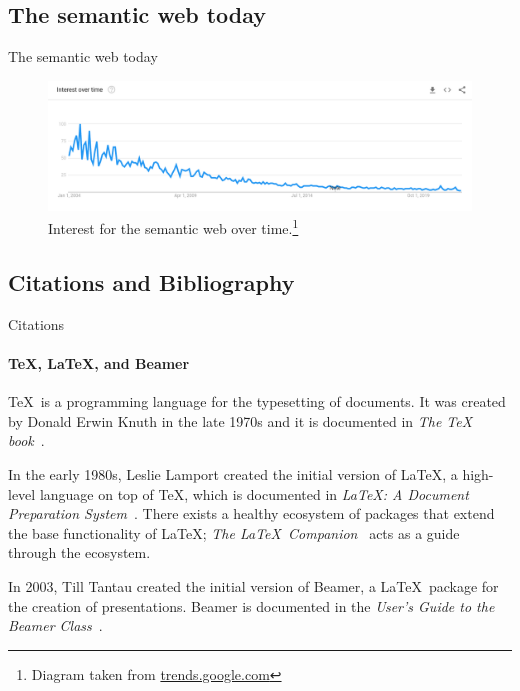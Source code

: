 \documentclass{beamer}
\begin{document}
	\subsection{The semantic web today}
	\begin{frame}{The semantic web today}
		\begin{figure}
			\includegraphics[scale=0.25]{resources/semantic-web-is-dead.png}
			\caption{Interest for the semantic web over time.\footnote[frame]{%
				Diagram taken from \url{trends.google.com} }}
		\end{figure}
	\end{frame}

	\subsection{Citations and Bibliography}
	\begin{frame}[label=citations]{Citations}
		\framesubtitle{\TeX, \LaTeX, and Beamer}

		\justifying\TeX\ is a programming language for the typesetting
		of documents. It was created by Donald Erwin Knuth in the late
		1970s and it is documented in \emph{The \TeX
		book}~\cite{knuth84}.

		In the early 1980s, Leslie Lamport created the initial version
		of \LaTeX, a high-level language on top of \TeX, which is
		documented in \emph{\LaTeX : A Document Preparation
		System}~\cite{lamport94}. There exists a healthy ecosystem of
		packages that extend the base functionality of \LaTeX;
		\emph{The \LaTeX\ Companion}~\cite{MG94} acts as a guide
		through the ecosystem.

		In 2003, Till Tantau created the initial version of Beamer, a
		\LaTeX\ package for the creation of presentations. Beamer is
		documented in the \emph{User's Guide to the Beamer
		Class}~\cite{tantau04}.
	\end{frame}
\end{document}
